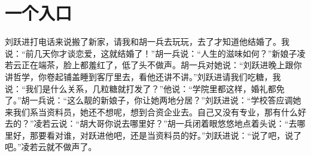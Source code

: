 \documentclass[12pt,oneside]{book}
\begin{document}
\chapter{一个入口}

刘跃进打电话来说搬了新家，请我和胡一兵去玩玩，去了才知道他结婚了。我说：``前几天你才谈恋爱，这就结婚了！''胡一兵说：``人生的滋味如何？''新娘子凌若云正在端茶，脸上都羞红了，低了头不做声。胡一兵对她说：``刘跃进晚上跟你讲哲学，你卷起铺盖睡到客厅里去，看他还讲不讲。''刘跃进请我们吃糖，我说：``我们是什么关系，几粒糖就打发了？''他说：``学院里都这样，婚礼都免了。''胡一兵说：``这么靓的新娘子，你让她两地分居？''刘跃进说：``学校答应调她来我们系当资料员，她还不想呢，想到合资企业去。自己又没有专业，那有什么好去的？''凌若云说：``胡大哥你说去哪里好？''胡一兵闭着眼悠悠地点着头说：``去哪里好，那要看对谁，对跃进他吧，还是当资料员的好。''刘跃进说：``说了吧，说了吧。''凌若云就不做声了。
\end{document}
